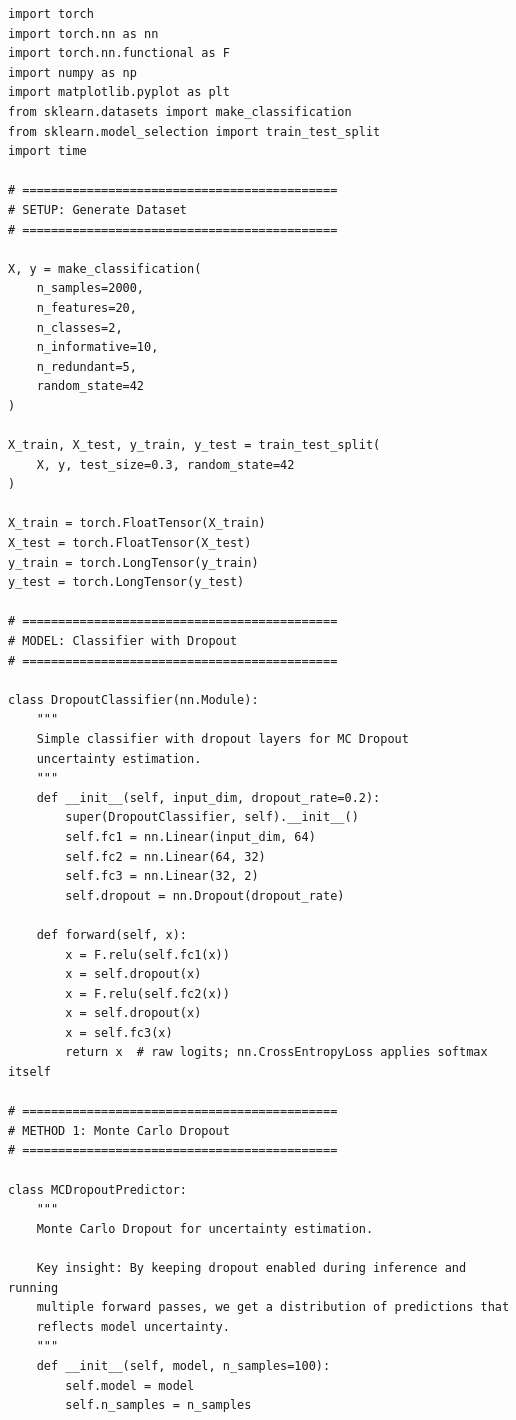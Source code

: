 \begin{lstlisting}[style=python, caption={Complete uncertainty estimation implementation}]
import torch
import torch.nn as nn
import torch.nn.functional as F
import numpy as np
import matplotlib.pyplot as plt
from sklearn.datasets import make_classification
from sklearn.model_selection import train_test_split
import time

# ============================================
# SETUP: Generate Dataset
# ============================================

X, y = make_classification(
    n_samples=2000,
    n_features=20,
    n_classes=2,
    n_informative=10,
    n_redundant=5,
    random_state=42
)

X_train, X_test, y_train, y_test = train_test_split(
    X, y, test_size=0.3, random_state=42
)

X_train = torch.FloatTensor(X_train)
X_test = torch.FloatTensor(X_test)
y_train = torch.LongTensor(y_train)
y_test = torch.LongTensor(y_test)

# ============================================
# MODEL: Classifier with Dropout
# ============================================

class DropoutClassifier(nn.Module):
    """
    Simple classifier with dropout layers for MC Dropout
    uncertainty estimation.
    """
    def __init__(self, input_dim, dropout_rate=0.2):
        super(DropoutClassifier, self).__init__()
        self.fc1 = nn.Linear(input_dim, 64)
        self.fc2 = nn.Linear(64, 32)
        self.fc3 = nn.Linear(32, 2)
        self.dropout = nn.Dropout(dropout_rate)

    def forward(self, x):
        x = F.relu(self.fc1(x))
        x = self.dropout(x)
        x = F.relu(self.fc2(x))
        x = self.dropout(x)
        x = self.fc3(x)
        return x  # raw logits; nn.CrossEntropyLoss applies softmax itself

# ============================================
# METHOD 1: Monte Carlo Dropout
# ============================================

class MCDropoutPredictor:
    """
    Monte Carlo Dropout for uncertainty estimation.

    Key insight: By keeping dropout enabled during inference and running
    multiple forward passes, we get a distribution of predictions that
    reflects model uncertainty.
    """
    def __init__(self, model, n_samples=100):
        self.model = model
        self.n_samples = n_samples


\end{lstlisting}
